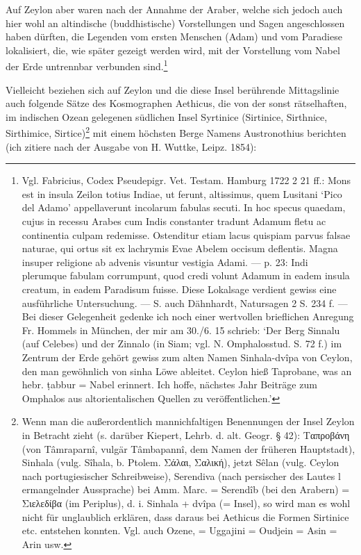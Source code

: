 \documentclass[a4paper, 11pt, oneside]{article}
\begin{document}
Auf Zeylon aber waren nach der Annahme der Araber, welche sich jedoch auch hier wohl an altindische (buddhistische) Vorstellungen und Sagen angeschlossen haben dürften, die Legenden vom ersten Menschen (Adam) und vom Paradiese lokalisiert, die, wie später gezeigt werden wird, mit der Vorstellung vom Nabel der Erde untrennbar verbunden sind.\footnote{Vgl. Fabricius, Codex Pseudepigr. Vet. Testam. Hamburg 1722 2 21 ff.: Mons est in insula Zeilon totius Indiae, ut ferunt, altissimus, quem Lusitani `Pico del Adamo' appellaverunt incolarum fabulas secuti. In hoc specus quaedam, cujus in recessu Arabes cum Indis constanter tradunt Adamum fletu ac continentia culpam redemisse. Ostenditur etiam lacus quispiam parvus falsae naturae, qui ortus sit ex lachrymis Evae Abelem occisum deflentis. Magna insuper religione ab advenis visuntur vestigia Adami. --- p. 23: Indi plerumque fabulam corrumpunt, quod credi volunt Adamum in eadem insula creatum, in eadem Paradisum fuisse. Diese Lokalsage verdient gewiss eine ausführliche Untersuchung. --- S. auch Dähnhardt, Natursagen 2 S. 234 f. --- Bei dieser Gelegenheit gedenke ich noch einer wertvollen brieflichen Anregung Fr. Hommels in München, der mir am 30./6. 15 schrieb: `Der Berg Sinnalu (auf Celebes) und der Zinnalo (in Siam; vgl. N. Omphalosstud. S. 72 f.) im Zentrum der Erde gehört gewiss zum alten Namen Sinhala-dvîpa von Ceylon, den man gewöhnlich von sinha Löwe ableitet. Ceylon hieß Taprobane, was an hebr. ṭabbur = Nabel erinnert. Ich hoffe, nächstes Jahr Beiträge zum Omphalos aus altorientalischen Quellen zu veröffentlichen.'}

Vielleicht beziehen sich auf Zeylon und die diese Insel berührende Mittagslinie auch folgende Sätze des Kosmographen Aethicus, die von der sonst rätselhaften, im indischen Ozean gelegenen südlichen Insel Syrtinice (Sirtinice, Sirthnice, Sirthimice, Sirtice)\footnote{Wenn man die außerordentlich mannichfaltigen Benennungen der Insel Zeylon in Betracht zieht (s. darüber Kiepert, Lehrb. d. alt. Geogr. § 42): Ταπροβάνη (von Tâmraparnî, vulgär Tâmbapannî, dem Namen der früheren Hauptstadt), Sinhala (vulg. Sîhala, b. Ptolem. Σάλαι, Σαλική), jetzt Sêlan (vulg. Ceylon nach portugiesischer Schreibweise), Serendiva (nach persischer des Lautes l ermangelnder Aussprache) bei Amm. Marc. = Serendîb (bei den Arabern) = Σιελεδίβα (im Periplus), d. i. Sinhala + dvîpa (= Insel), so wird man es wohl nicht für unglaublich erklären, dass daraus bei Aethicus die Formen Sirtinice etc. entstehen konnten. Vgl. auch Ozene, = Uggajini = Oudjein = Asin = Arin usw.} mit einem höchsten Berge Namens Austronothius berichten (ich zitiere nach der Ausgabe von H. Wuttke, Leipz. 1854):
\end{document}
